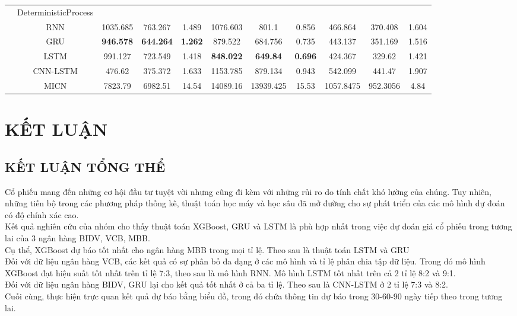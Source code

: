 \documentclass[conference]{IEEEtran}
\begin{document}
\begin{table}[t]
\begin{tabular}{lcccccccccc}
                    & DeterministicProcess & & & \\
                    & RNN & 1035.685 & 763.267 & 1.489 & 1076.603 & 801.1 & 0.856 & 466.864 & 370.408 & 1.604\\
                    & GRU & \textbf{946.578} & \textbf{644.264} & \textbf{1.262}  & 879.522 & 684.756 & 0.735 & 443.137 & 351.169 & 1.516\\
                    & LSTM & 991.127 & 723.549 & 1.418 & \textbf{848.022} & \textbf{649.84} & \textbf{0.696} & 424.367 & 329.62 & 1.421\\
                    & CNN-LSTM & 476.62 & 375.372 & 1.633 & 1153.785 & 879.134 & 0.943 & 542.099 & 441.47 & 1.907\\
                    & MICN  & 7823.79 & 6982.51 & 14.54 & 14089.16 & 13939.425 & 15.53 & 1057.8475 & 952.3056 & 4.84\\
                    \bottomrule
\end{tabular}
\end{table}

\text{   
   
}
\section{KẾT LUẬN}
\subsection{KẾT LUẬN TỔNG THỂ}
Cổ phiếu mang đến những cơ hội đầu tư tuyệt vời nhưng cũng đi kèm với những rủi ro do tính chất khó lường của chúng. Tuy nhiên, những tiến bộ trong các phương pháp thống kê, thuật toán học máy và học sâu đã mở đường cho sự phát triển của các mô hình dự đoán có độ chính xác cao.\\
Kết quả nghiên cứu của nhóm cho thấy thuật toán XGBoost, GRU và LSTM là phù hợp nhất trong việc dự đoán giá cổ phiếu
trong tương lai của 3 ngân hàng BIDV, VCB, MBB. \\
Cụ thể, XGBoost dự báo tốt nhất cho ngân hàng MBB trong mọi tỉ lệ. Theo sau là thuật toán LSTM và GRU\\
Đối với dữ liệu ngân hàng VCB, các kết quả có sự phân bố đa dạng ở các mô hình và tỉ lệ phân chia tập dữ liệu. Trong đó mô hình XGBoost đạt hiệu suất tốt nhất trên tỉ lệ 7:3, theo sau là mô hình RNN. Mô hình LSTM tốt nhất trên cả 2 tỉ lệ 8:2 và 9:1.\\
Đối với dữ liệu ngân hàng BIDV, GRU lại cho kết quả tốt nhất ở cả ba tỉ lệ. Theo sau là CNN-LSTM ở 2 tỉ lệ 7:3 và 8:2.\\
Cuối cùng, thực hiện trực quan kết quả dự báo bằng biểu đồ, trong đó chứa thông tin dự báo trong 30-60-90 ngày tiếp theo trong tương lai.
\end{document}
